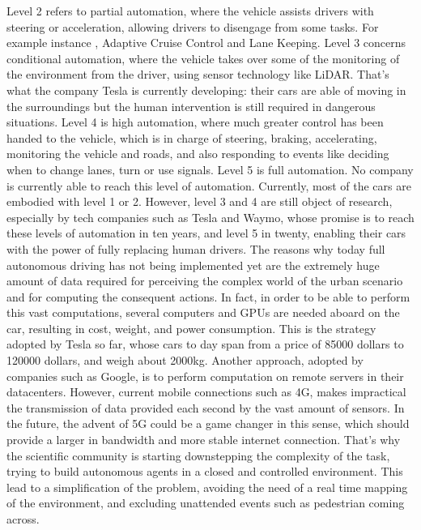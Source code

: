 Level 2 refers to partial automation, where the vehicle assists drivers with steering or acceleration, allowing drivers to disengage from some tasks.  For example instance , Adaptive Cruise Control and Lane Keeping.
Level 3 concerns conditional automation, where the vehicle takes over some of the monitoring of the environment from the driver, using sensor technology like LiDAR. That's what the company Tesla is currently developing: their cars are able of moving in the surroundings but the human intervention is still required in dangerous situations.
Level 4 is high automation, where much greater control has been handed to the vehicle, which is in charge of steering, braking, accelerating, monitoring the vehicle and roads, and also responding to events like deciding when to change lanes, turn or use signals.
Level 5 is full automation. No company is currently able to reach this level of automation.
Currently, most of the cars are embodied with level 1 or 2. However, level 3 and 4 are still object of research, especially by tech companies such as Tesla and Waymo, whose promise is to reach these levels of automation in ten years, and level 5 in twenty, enabling their cars with the power of fully replacing human drivers.
The reasons why today full autonomous driving has not being implemented yet are the extremely huge amount of data required for perceiving the complex world of the urban scenario and for computing the consequent actions. In fact, in order to be able to perform this vast computations, several computers and GPUs are needed aboard on the car, resulting in cost, weight, and power consumption. This is the strategy adopted by Tesla so far, whose cars to day span from a price of 85000 dollars to 120000 dollars, and weigh about 2000kg. 
Another approach, adopted by companies such as Google, is to perform computation on remote servers in their datacenters. However, current mobile connections such as 4G, makes impractical the transmission of data provided each second by the vast amount of sensors.
In the future, the advent of 5G could be a game changer in this sense, which should provide a larger in bandwidth and more stable internet connection.
That's why the scientific community is starting downstepping the complexity of the task, trying to build autonomous agents in a closed and controlled environment. This lead to a simplification of the problem, avoiding the need of a real time mapping of the environment, and excluding unattended events such as pedestrian coming across.



